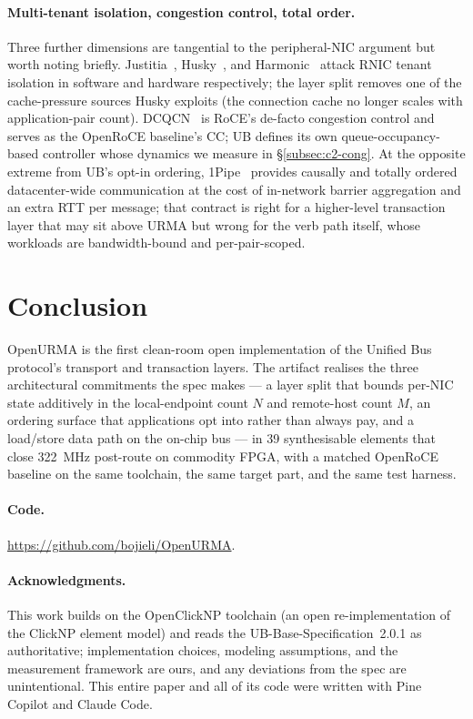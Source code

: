 \documentclass[10pt,twocolumn]{article}
\begin{document}
\paragraph{Multi-tenant isolation, congestion control, total
order.} Three further dimensions are tangential to the
peripheral-NIC argument but worth noting briefly.
Justitia~\cite{zhang2022:justitia}, Husky~\cite{kong2023:husky},
and Harmonic~\cite{lou2024:harmonic} attack RNIC tenant
isolation in software and hardware respectively; the layer split
removes one of the cache-pressure sources Husky exploits
(the connection cache no longer scales with application-pair
count). DCQCN~\cite{zhu2015:dcqcn} is RoCE's de-facto
congestion control and serves as the OpenRoCE baseline's CC; UB
defines its own queue-occupancy-based controller whose dynamics
we measure in \S\ref{subsec:c2-cong}. At the opposite extreme
from UB's opt-in ordering, 1Pipe~\cite{li2021:1pipe} provides
causally and totally ordered datacenter-wide communication at
the cost of in-network barrier aggregation and an extra RTT per
message; that contract is right for a higher-level transaction
layer that may sit above URMA but wrong for the verb path
itself, whose workloads are bandwidth-bound and per-pair-scoped.

\section{Conclusion}
\label{sec:concl}

OpenURMA is the first clean-room open implementation of the Unified
Bus protocol's transport and transaction layers. The artifact realises
the three architectural commitments the spec makes --- a layer split
that bounds per-NIC state additively in the local-endpoint
count $N$ and remote-host count $M$, an ordering
surface that applications opt into rather than always pay, and a
load/store data path on the on-chip bus --- in 39 synthesisable
elements that close 322~MHz post-route on commodity FPGA, with a
matched OpenRoCE baseline on the same toolchain, the same target
part, and the same test harness.

\paragraph{Code.} \url{https://github.com/bojieli/OpenURMA}.

\paragraph{Acknowledgments.}
This work builds on the OpenClickNP toolchain (an open
re-implementation of the ClickNP element model) and reads the
UB-Base-Specification~2.0.1 as authoritative; implementation
choices, modeling assumptions, and the measurement framework are
ours, and any deviations from the spec are unintentional. This
entire paper and all of its code were written with Pine Copilot and
Claude Code.



\end{document}
